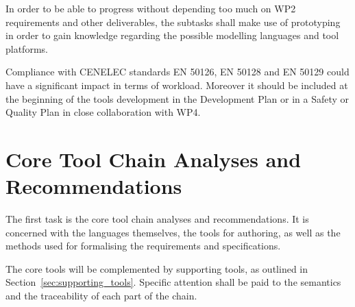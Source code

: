 \documentclass{template/openetcs_article}
\begin{document}
In order to be able to progress without depending too much on WP2 requirements and other deliverables, the subtasks shall make use of prototyping in order to gain knowledge regarding the possible modelling languages and tool platforms.  

Compliance with CENELEC standards EN 50126, EN 50128 and EN 50129 could have a
significant impact in terms of workload. Moreover it should be included at the
beginning of the tools development in the Development Plan or in a Safety or
Quality Plan in close collaboration with WP4.

\section{Core Tool Chain Analyses and
           Recommendations}
\label{sec:core_tool}

The first task is the core tool chain analyses and recommendations. It
is concerned with the languages themselves, the tools for authoring, as well as the methods used for formalising the requirements and specifications.

The core tools will be complemented by supporting tools, as outlined in Section~\ref{sec:supporting_tools}.
Specific attention shall be paid to the semantics and the traceability of each part of the chain.



\end{document}
